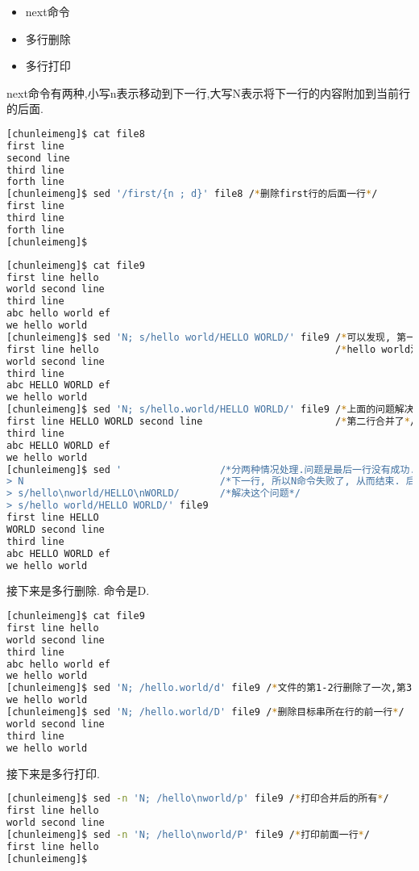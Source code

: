 \documentclass{article}
\begin{document}
\begin{itemize}
	\item next命令
	\item 多行删除
	\item 多行打印
\end{itemize}
next命令有两种,小写n表示移动到下一行,大写N表示将下一行的内容附加到当前行的后面. \par
\begin{lstlisting}[language=bash, caption={next-n}]
[chunleimeng]$ cat file8
first line
second line
third line
forth line
[chunleimeng]$ sed '/first/{n ; d}' file8 /*删除first行的后面一行*/
first line
third line
forth line
[chunleimeng]$
\end{lstlisting}
\begin{lstlisting}[language=bash, caption={next-N}]
[chunleimeng]$ cat file9
first line hello
world second line
third line
abc hello world ef
we hello world
[chunleimeng]$ sed 'N; s/hello world/HELLO WORLD/' file9 /*可以发现, 第一行第二行换行的*/
first line hello                                         /*hello world没有替换成功*/
world second line
third line
abc HELLO WORLD ef
we hello world
[chunleimeng]$ sed 'N; s/hello.world/HELLO WORLD/' file9 /*上面的问题解决了, 但是第一行*/
first line HELLO WORLD second line                       /*第二行合并了*/
third line
abc HELLO WORLD ef
we hello world
[chunleimeng]$ sed '                 /*分两种情况处理.问题是最后一行没有成功.因为没有*/
> N                                  /*下一行, 所以N命令失败了, 从而结束. 后面一节会*/
> s/hello\nworld/HELLO\nWORLD/       /*解决这个问题*/
> s/hello world/HELLO WORLD/' file9
first line HELLO
WORLD second line
third line
abc HELLO WORLD ef
we hello world
\end{lstlisting}
接下来是多行删除. 命令是D. \par
\begin{lstlisting}[language=bash, caption={Delete-D}]
[chunleimeng]$ cat file9
first line hello
world second line
third line
abc hello world ef
we hello world
[chunleimeng]$ sed 'N; /hello.world/d' file9 /*文件的第1-2行删除了一次,第3-4行删除了一次*/
we hello world
[chunleimeng]$ sed 'N; /hello.world/D' file9 /*删除目标串所在行的前一行*/
world second line
third line
we hello world
\end{lstlisting}
接下来是多行打印. \par
\begin{lstlisting}[language=bash, caption={Print}]
[chunleimeng]$ sed -n 'N; /hello\nworld/p' file9 /*打印合并后的所有*/
first line hello
world second line
[chunleimeng]$ sed -n 'N; /hello\nworld/P' file9 /*打印前面一行*/
first line hello
[chunleimeng]$
\end{lstlisting}
\end{document}
